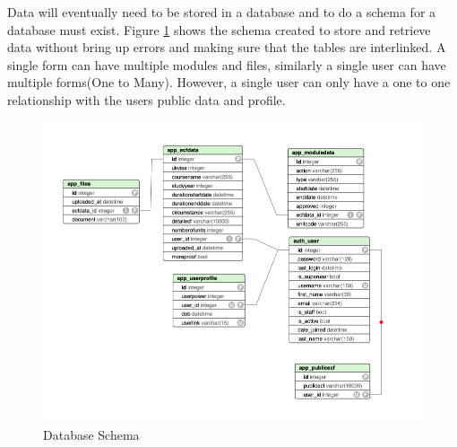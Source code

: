 \documentclass[../main.tex]{subfiles}
\begin{document}
\raggedright
Data will eventually need to be stored in a database and to do a schema for a database must exist. Figure \ref{fig:dbschema} shows the schema created to store and retrieve data without bring up errors and making sure that the tables are interlinked. A single form can have multiple modules and files, similarly a single user can have multiple forms(One to Many). However, a single user can only have a one to one relationship with the users public data and profile. 

\begin{figure}[H]
        \includegraphics[scale=1.2]
        {images/db.png}
        \caption{\label{fig:dbschema} Database Schema}
      \end{figure}
  
  
\end{document}

